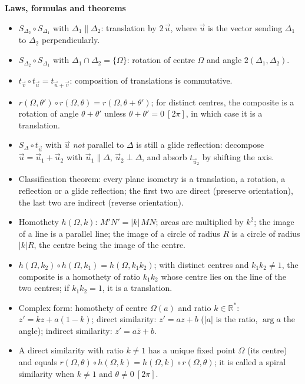 \documentclass[11pt]{article}
\newcommand{\cle}[1]{{\popxbold\color{popdark}#1}}
\begin{document}
\begin{bilan}
\textbf{Laws, formulas and theorems}\par
\begin{itemize}
\item $S_{\Delta_2}\circ S_{\Delta_1}$ with $\Delta_1\parallel\Delta_2$: translation by $2\,\vec{u}$, where $\vec{u}$ is the vector sending $\Delta_1$ to $\Delta_2$ perpendicularly.
\item $S_{\Delta_2}\circ S_{\Delta_1}$ with $\Delta_1\cap\Delta_2=\{\Omega\}$: rotation of centre $\Omega$ and angle $2(\Delta_1,\Delta_2)$.
\item $t_{\vec{v}}\circ t_{\vec{u}}=t_{\vec{u}+\vec{v}}$: composition of translations is commutative.
\item $r(\Omega,\theta')\circ r(\Omega,\theta)=r(\Omega,\theta+\theta')$; for distinct centres, the composite is a rotation of angle $\theta+\theta'$ unless $\theta+\theta'=0\ [2\pi]$, in which case it is a translation.
\item $S_\Delta\circ t_{\vec{u}}$ with $\vec{u}$ \emph{not} parallel to $\Delta$ is still a glide reflection: decompose $\vec{u}=\vec{u}_1+\vec{u}_2$ with $\vec{u}_1\parallel\Delta$, $\vec{u}_2\perp\Delta$, and absorb $t_{\vec{u}_2}$ by shifting the axis.
\item Classification theorem: every plane isometry is a translation, a rotation, a reflection or a glide reflection; the first two are \cle{direct} (preserve orientation), the last two are \cle{indirect} (reverse orientation).
\item Homothety $h(\Omega,k)$: $M'N'=|k|\,MN$; areas are multiplied by $k^2$; the image of a line is a parallel line; the image of a circle of radius $R$ is a circle of radius $|k|R$, the centre being the image of the centre.
\item $h(\Omega,k_2)\circ h(\Omega,k_1)=h(\Omega,k_1k_2)$; with distinct centres and $k_1k_2\neq 1$, the composite is a homothety of ratio $k_1k_2$ whose centre lies on the line of the two centres; if $k_1k_2=1$, it is a translation.
\item Complex form: homothety of centre $\Omega(a)$ and ratio $k\in\mathbb{R}^*$: $z'=kz+a(1-k)$; direct similarity: $z'=az+b$ ($|a|$ is the ratio, $\arg a$ the angle); indirect similarity: $z'=a\bar{z}+b$.
\item A direct similarity with ratio $k\neq 1$ has a unique fixed point $\Omega$ (its centre) and equals $r(\Omega,\theta)\circ h(\Omega,k)=h(\Omega,k)\circ r(\Omega,\theta)$; it is called a \cle{spiral similarity} when $k\neq 1$ and $\theta\neq 0\ [2\pi]$.
\end{itemize}


\end{bilan}
\end{document}
